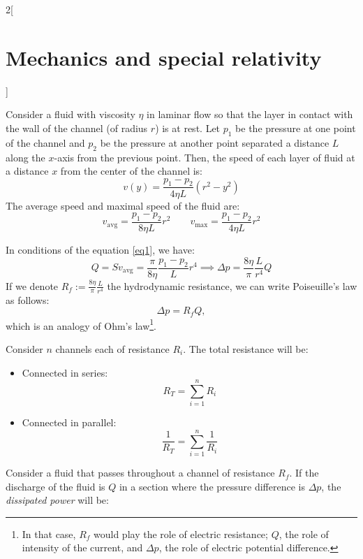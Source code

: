 \documentclass[../../../main.tex]{subfiles}
\begin{document}
\begin{multicols}{2}[\section{Mechanics and special relativity}]
\begin{prop}[Viscosity]
  \end{prop}
  \begin{center}
    \begin{minipage}{\linewidth}
      \centering
      
    \end{minipage}
  \end{center}
  \begin{prop}
    Consider a fluid with viscosity $\eta$ in laminar flow so that the layer in contact with the wall of the channel (of radius $r$) is at rest. Let $p_1$ be the pressure at one point of the channel and $p_2$ be the pressure at another point separated a distance $L$ along the $x$-axis from the previous point. Then, the speed of each layer of fluid at a distance $x$ from the center of the channel is:
    $$v(y)=\frac{p_1-p_2}{4\eta L}(r^2-y^2)$$ The average speed and maximal speed of the fluid are:
    \begin{equation}
      v_\text{avg}=\frac{p_1-p_2}{8\eta L}r^2\qquad v_\text{max}=\frac{p_1-p_2}{4\eta L}r^2
      \label{eq1}
    \end{equation}
  \end{prop}
  \begin{prop}
    In conditions of the equation \eqref{eq1}, we have: $$Q=Sv_\text{avg}=\frac{\pi}{8\eta }\frac{p_1-p_2}{L}r^4\implies\Delta p=\frac{8\eta}{\pi}\frac{L}{r^4}Q$$ If we denote $\displaystyle R_f:=\frac{8\eta}{\pi}\frac{L}{r^4}$ the hydrodynamic resistance, we can write Poiseuille's law as follows: $$\Delta p=R_f Q,$$ which is an analogy of Ohm's law\footnote{In that case, $R_f$ would play the role of electric resistance; $Q$, the role of intensity of the current, and $\Delta p$, the role of electric potential difference.}.
  \end{prop}
  \begin{prop}
    Consider $n$ channels each of resistance $R_i$. The total resistance will be:
    \begin{itemize}
      \item Connected in series: $$R_T=\sum_{i=1}^nR_i$$
      \item Connected in parallel: $$\frac{1}{R_T}=\sum_{i=1}^n\frac{1}{R_i}$$
    \end{itemize}
  \end{prop}
  \begin{prop}
    Consider a fluid that passes throughout a channel of resistance $R_f$. If the discharge of the fluid is $Q$ in a section where the pressure difference is $\Delta p$, the \textit{dissipated power} will be:

\end{prop}
\end{multicols}
\end{document}
